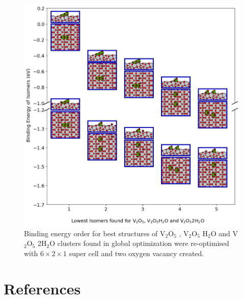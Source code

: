 \documentclass[aip,amsmath,amssymb,reprint, jcp]{revtex4-1}
\begin{document}
\begin{figure}
\centering
\includegraphics[width=1.0\textwidth]{BE_order_2Ov_V2O5clu_TiO2_101sur.png}
\caption{Binding energy order for best structures of V$_2$O$_5$ , V$_2$O$_5$ H$_2$O and V$_2$O$_5$ 2H$_2$O clusters found in global optimization were re-optimised with $6 \times 2 \times 1$ super cell  and  two oxygen vacancy created.}
\label{fig:BE_1Ov}
\end{figure}

\section{References}

\end{document}
